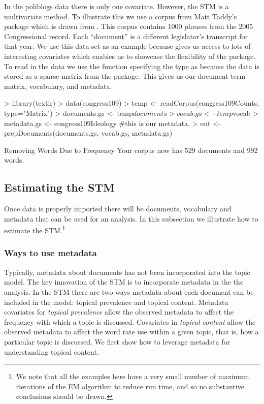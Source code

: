 \documentclass[nojss]{jss}
\begin{document}
In the poliblogs data there is only one covariate. However, the STM is a multivariate method. To illustrate this we use a corpus from Matt Taddy's  package which is drawn from \citet{gentzkow2010drives}. This corpus contains 1000 phrases from the 2005 Congressional record. Each ``document'' is a different legislator's transcript for that year. We use this data set as an example because gives us access to lots of interesting covariates which enables us to showcase the flexibility of the  package. To read in the data we use the  function specifying the type as  because the data is stored as a sparse matrix from the  package. This gives us our document-term matrix, vocabulary, and metadata.

\begin{Schunk}
\begin{Sinput}
> library(textir)
> data(congress109)
> temp <- readCorpus(congress109Counts, type="Matrix")
> documents.gs <- temp$documents
> vocab.gs <- temp$vocab
> metadata.gs <- congress109Ideology #this is our metadata.
> out <-prepDocuments(documents.gs, vocab.gs, metadata.gs)
\end{Sinput}
\begin{Soutput}
Removing Words Due to Frequency 
Your corpus now has 529 documents and 992 words.
\end{Soutput}
\end{Schunk}


\subsection{Estimating the STM}

Once data is properly imported there will be documents, vocabulary and metadata that can be used for an analysis. In this subsection we illustrate how to estimate the STM.\footnote{We note that all the examples here have a very small number of maximum iterations of the EM algorithm to reduce run time, and so no substantive conclusions should be drawn.}


\subsubsection{Ways to use metadata}

Typically, metadata about documents has not been incorporated into the topic model. The key innovation of the STM is to incorporate metadata in the the analysis. In the STM there are two ways metadata about each document can be included in the model: topical prevalence and topical content.  Metadata covariates for \emph{topical prevalence} allow the observed metadata to affect the frequency with which a topic is discussed.  Covariates in \emph{topical content} allow the observed metadata to affect the word rate use within a given topic, that is, how a particular topic is discussed. We first show how to leverage metadata for understanding topical content.
\end{document}
